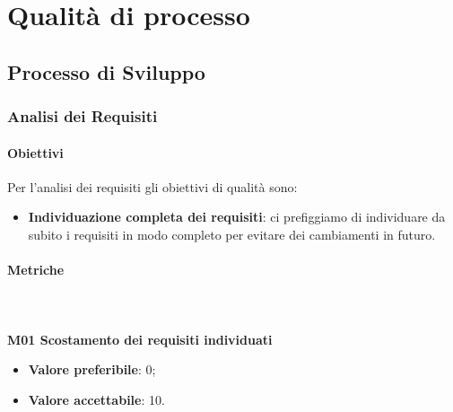 \section{Qualità di processo}
	\subsection{Processo di Sviluppo}
		\subsubsection{Analisi dei Requisiti} 
			\paragraph{Obiettivi}
			Per l'analisi dei requisiti gli obiettivi di qualità sono:
			\begin{itemize}
				\item \textbf{Individuazione completa dei requisiti}: ci prefiggiamo di individuare da subito i requisiti in modo completo per evitare dei cambiamenti in futuro.
			\end{itemize}
			\paragraph{Metriche} \mbox{} \\ \\
				\textbf{M01 Scostamento dei requisiti individuati} 
				\begin{itemize}
					\item \textbf{Valore preferibile}: 0;
					\item \textbf{Valore accettabile}: 10.
				\end{itemize}
			
